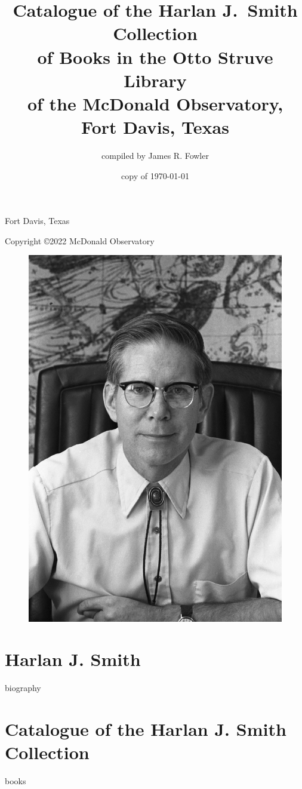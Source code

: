 \documentclass{article}%
\begin{document}
\title{Catalogue of the Harlan J.~Smith Collection \\
  of Books in the Otto Struve Library \\
  of the McDonald Observatory, \\
  Fort Davis, Texas}
\author{compiled by James R. Fowler}
\date{copy of \today}
\maketitle

\newpage

\vspace*{7 in}
\centerline{Fort Davis, Texas}
\centerline{Copyright \copyright 2022 McDonald Observatory}

\begin{figure}
  \includegraphics{hjs_photo.jpg}
  \label{fig:hjs}
\end{figure}
  
\newpage
\hbox{\hfil}
\newpage

\section*{Harlan J. Smith}
{biography}

\newpage

\section*{Catalogue of the Harlan J. Smith Collection}

{books}
\end{document}
